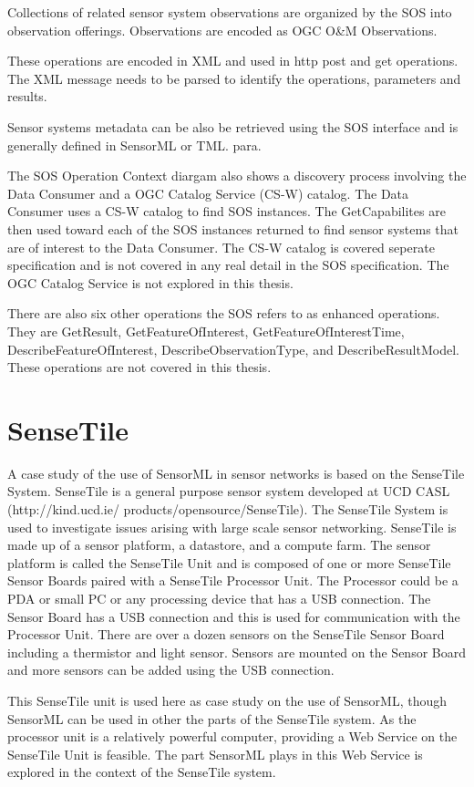 \documentclass[]{final_report}
\begin{document}
Collections of related sensor system observations are organized by the SOS into observation offerings. Observations are encoded as OGC O\&M Observations. 

These operations are encoded in XML and used in http post and get operations. The XML message needs to be parsed to identify the operations, parameters and results. 

Sensor systems metadata can be also be retrieved using the SOS interface and is generally defined in SensorML or TML.
para. 

The SOS Operation Context diargam also shows a discovery process involving the  Data Consumer and a OGC Catalog Service (CS-W) catalog. The Data Consumer uses a CS-W catalog to find SOS instances. The GetCapabilites are then used toward each of the SOS instances returned to find sensor systems that are of interest to the Data Consumer. The CS-W catalog is covered seperate specification \cite{OGCcatref} and is not covered in any real detail in the SOS specification. The OGC Catalog Service is not explored in this thesis.

There are also six other operations the SOS refers to as enhanced operations. They are GetResult,
GetFeatureOfInterest, GetFeatureOfInterestTime, DescribeFeatureOfInterest,
DescribeObservationType, and DescribeResultModel. These operations are not covered in this thesis.

\section{SenseTile}
A case study of the use of SensorML in sensor networks is based on the SenseTile System. SenseTile is a general purpose sensor system developed at UCD CASL (http://kind.ucd.ie/
products/opensource/SenseTile). The SenseTile System is used to investigate issues arising with large scale sensor networking. SenseTile is made up of a sensor platform, a datastore, and a compute farm.  The sensor platform is called the SenseTile Unit and is composed of one or more SenseTile Sensor Boards paired with a SenseTile Processor Unit. The Processor could be a PDA or small PC or any processing device that has a USB connection.  The Sensor Board has a USB connection and this is used for communication with the Processor Unit. There are over a dozen sensors on the SenseTile Sensor Board including a thermistor and light sensor. Sensors are mounted on the Sensor Board and more sensors can be added using the USB connection.

This SenseTile unit is used here as case study on the use of SensorML, though SensorML can be used in other the parts of the SenseTile system. As the processor unit is  a relatively powerful computer, providing a Web Service on the SenseTile Unit is feasible. The part SensorML plays in this Web Service is explored in the context of the SenseTile system.
\end{document}
